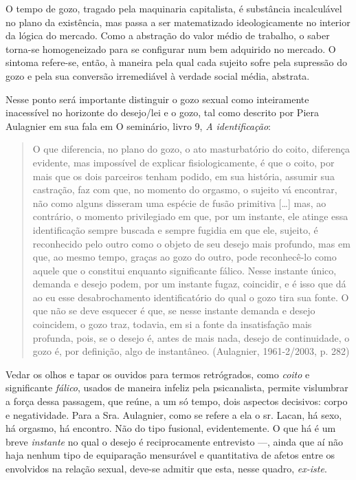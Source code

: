 O tempo de gozo, tragado pela maquinaria capitalista, é substância
incalculável no plano da existência, mas passa a ser matematizado
ideologicamente no interior da lógica do mercado. Como a abstração do
valor médio de trabalho, o saber torna-se homogeneizado para se
configurar num bem adquirido no mercado. O sintoma refere-se, então, à
maneira pela qual cada sujeito sofre pela supressão do gozo e pela sua
conversão irremediável à verdade social média, abstrata.

Nesse ponto será importante distinguir o gozo sexual como inteiramente
inacessível no horizonte do desejo/lei e o gozo, tal como descrito por
Piera Aulagnier em sua fala em O seminário, livro 9, \emph{A
identificação}:

\begin{quote}
O que diferencia, no plano do gozo, o ato masturbatório do coito,
diferença evidente, mas impossível de explicar fisiologicamente, é que o
coito, por mais que os dois parceiros tenham podido, em sua história,
assumir sua castração, faz com que, no momento do orgasmo, o sujeito vá
encontrar, não como alguns disseram uma espécie de fusão primitiva
{[}\ldots{}{]} mas, ao contrário, o momento privilegiado em que, por um
instante, ele atinge essa identificação sempre buscada e sempre fugidia
em que ele, sujeito, é reconhecido pelo outro como o objeto de seu
desejo mais profundo, mas em que, ao mesmo tempo, graças ao gozo do
outro, pode reconhecê-lo como aquele que o constitui enquanto
significante fálico. Nesse instante único, demanda e desejo podem, por
um instante fugaz, coincidir, e é isso que dá ao eu esse desabrochamento
identificatório do qual o gozo tira sua fonte. O que não se deve
esquecer é que, se nesse instante demanda e desejo coincidem, o gozo
traz, todavia, em si a fonte da insatisfação mais profunda, pois, se o
desejo é, antes de mais nada, desejo de continuidade, o gozo é, por
definição, algo de instantâneo. (Aulagnier, 1961-2/2003, p. 282)
\end{quote}

Vedar os olhos e tapar os ouvidos para termos retrógrados, como
\emph{coito} e significante \emph{fálico}, usados de maneira infeliz
pela psicanalista, permite vislumbrar a força dessa passagem, que reúne,
a um só tempo, dois aspectos decisivos: corpo e negatividade. Para a
Sra. Aulagnier, como se refere a ela o sr. Lacan, há sexo, há orgasmo,
há encontro. Não do tipo fusional, evidentemente. O que há é um breve
\emph{instante} no qual o desejo é reciprocamente entrevisto ---, ainda
que aí não haja nenhum tipo de equiparação mensurável e quantitativa de
afetos entre os envolvidos na relação sexual, deve-se admitir que esta,
nesse quadro, \emph{ex-iste}.

